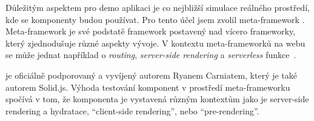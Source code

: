 Důležitým aspektem pro demo aplikaci je co nejbližší simulace reálného prostředí, kde se komponenty budou používat.
Pro tento účel jsem zvolil meta-framework . Meta-framework je své podstatě framework postavený nad vícero frameworky, který zjednodušuje různé aspekty vývoje.
V kontextu meta-frameworků na webu se může jednat například o \textit{routing}, \textit{server-side rendering} a \textit{serverless} funkce~\cite{prismic-metaframework}.

 je oficiálně podporovaný a vyvíjený autorem Ryanem Carniatem, který je také autorem Solid.js.
Výhoda testování komponent v prostředí meta-frameworku spočívá v tom, že komponenta je vystavená různým kontextům jako je server-side rendering a hydratace, ``client-side rendering'', nebo ``pre-rendering''.
